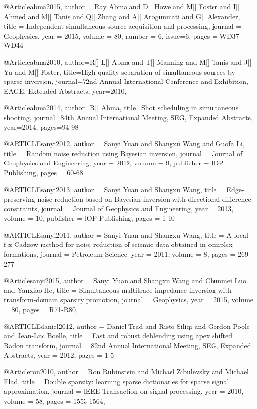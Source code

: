 @Article{abma2015,
  author = 	 {Ray Abma and D[] Howe and M[] Foster and I[] Ahmed and M[] Tanis and Q[] Zhang and A[] Arogunmati and G[] Alexander},
  title = 	 {Independent simultaneous source acquisition and processing},
  journal = 	 {Geophysics},
  year = 	 2015,
  volume = 	 80,
  number = 	 6,
  issue=6,
  pages = 	 {WD37-WD44}}



@Article{abma2010,
  author={R[] L[] Abma and T[] Manning and M[] Tanis and J[] Yu and M[] Foster},
  title={High quality separation of simultaneous sources by sparse inversion},
  journal={72nd Annual International Conference and Exhibition, EAGE, Extended Abstracts},
  year=2010,
}

@Article{abma2014,
  author={R[] Abma},
  title={Shot scheduling in simultaneous shooting},
  journal={84th Annual International Meeting, SEG, Expanded Abstracts},
  year=2014,
  pages={94-98}
}

@ARTICLE{sanyi2012,
  author = {Sanyi Yuan and Shangxu Wang and Guofa Li},
  title = {Random noise reduction using Bayesian inversion},
  journal = {Journal of Geophysics and Engineering},
  year = {2012},
  volume = {9},
  publisher = {IOP Publishing},
  pages = {60-68}
}

@ARTICLE{sanyi2013,
  author = {Sanyi Yuan and Shangxu Wang},
  title = {Edge-preserving noise reduction based on Bayesian inversion with directional difference constraints},
  journal = {Journal of Geophysics and Engineering},
  year = {2013},
  volume = {10},
  publisher = {IOP Publishing},
  pages = {1-10}
}

@ARTICLE{sanyi2011,
  author = {Sanyi Yuan and Shangxu Wang},
  title = {A local f-x Cadzow method for noise reduction of seismic data obtained in complex formations},
  journal = {Petroleum Science},
  year = {2011},
  volume = {8},
  pages = {269-277}
}

@Article{sanyi2015,
  author = 	 {Sanyi Yuan and Shangxu Wang and Chunmei Luo and Yanxiao He},
  title = 	 {Simultaneous multitrace impedance inversion with transform-domain sparsity promotion},
  journal = 	 {Geophysics},
  year = 	 2015,
  volume =	 80,
  pages =	 {R71-R80},
}

@ARTICLE{daniel2012,
  author = {Daniel Trad and Risto Siliqi and Gordon Poole and Jean-Luc Boelle},
  title = {Fast and robust deblending using apex shifted Radon transform},
  journal = {82nd Annual International Meeting, SEG, Expanded Abstracts},
  year = {2012},
  pages = {1-5}
}

@Article{ron2010,
  author = 	 {Ron Rubinstein and Michael Zibulevsky and Michael Elad},
  title = 	 {Double sparsity: learning sparse dictionaries for sparse signal approximation},
  journal = 	 {IEEE Transaction on signal processing},
  year = 	 2010,
  volume =	 58,
  pages =	 {1553-1564},
}

